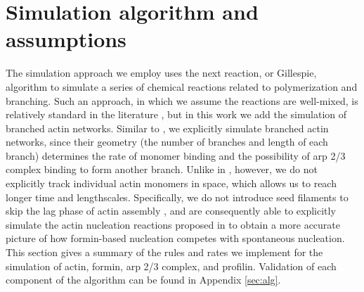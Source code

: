 \documentclass[11pt]{article}
\begin{document}
\section{Simulation algorithm and assumptions \label{sec:sim}}
The simulation approach we employ uses the next reaction, or Gillespie, algorithm \cite{gillespie2007stochastic} to simulate a series of chemical reactions related to polymerization and branching. Such an approach, in which we assume the reactions are well-mixed, is relatively standard in the literature \cite{fass2008stochastic, banerjee2022emergence}, but in this work we add the simulation of branched actin networks. Similar to \cite{ni2019turnover, liman2020role}, we explicitly simulate branched actin networks, since their geometry (the number of branches and length of each branch) determines the rate of monomer binding and the possibility of arp 2/3 complex binding to form another branch. Unlike in \cite{ni2019turnover}, however, we do not explicitly track individual actin monomers in space, which allows us to reach longer time and lengthscales. Specifically, we do not introduce seed filaments to skip the lag phase of actin assembly \cite{chandrasekaran2022nucleation}, and are consequently able to explicitly simulate the actin nucleation reactions proposed in \cite{rosenbloom2021mechanism} to obtain a more accurate picture of how formin-based nucleation competes with spontaneous nucleation. This section gives a summary of the rules and rates we implement for the simulation of actin, formin, arp 2/3 complex, and profilin. Validation of each component of the algorithm can be found in Appendix \ref{sec:alg}.
\end{document}
